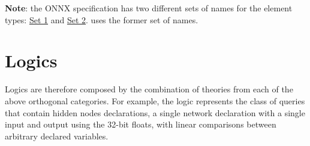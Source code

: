 \textbf{Note}: the ONNX specification has two different sets of names for the element types: \href{https://onnx.ai/onnx/repo-docs/IR.html#tensor-element-types}{Set 1} and \href{https://onnx.ai/onnx/intro/concepts.html#element-type}{Set 2}. \vnnlib{} uses the former set of names.

\section{Logics}

Logics are therefore composed by the combination of theories from each of the above orthogonal categories. For example, the logic  represents the class of queries that contain hidden nodes declarations, a single network declaration with a single input and output using the 32-bit floats, with linear comparisons between arbitrary declared variables.
